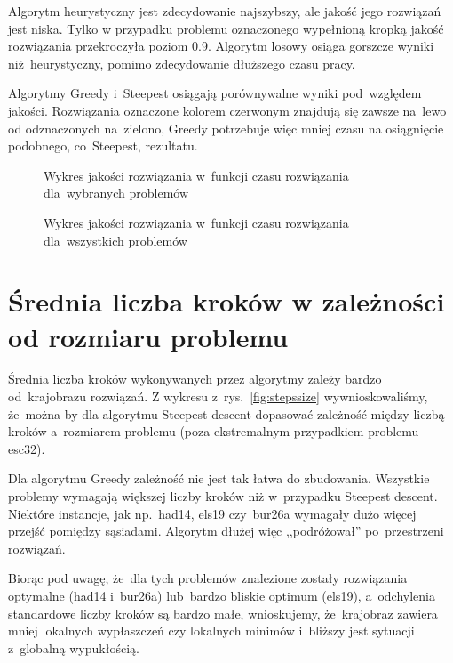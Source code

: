 \documentclass[a4paper,10pt]{article}
\begin{document}
Algorytm heurystyczny jest zdecydowanie najszybszy, ale jakość jego rozwiązań jest niska. 
Tylko w przypadku problemu oznaczonego wypełnioną kropką jakość rozwiązania przekroczyła poziom \num{0.9}.
Algorytm losowy osiąga gorszcze wyniki niż~heurystyczny, pomimo zdecydowanie dłuższego czasu pracy.

Algorytmy Greedy i~Steepest osiągają porównywalne wyniki pod~względem jakości.
Rozwiązania oznaczone kolorem czerwonym znajdują się zawsze na~lewo od odznaczonych na~zielono,
Greedy potrzebuje więc mniej czasu na osiągnięcie podobnego, co~Steepest, rezultatu.

\begin{figure}[!htpb]
\begin{center}

\caption{Wykres jakości rozwiązania w~funkcji czasu rozwiązania dla~wybranych problemów}
\label{fig:qualitytime}
\end{center}
\end{figure}

\begin{figure}
\begin{center}

\caption{Wykres jakości rozwiązania w~funkcji czasu rozwiązania dla~wszystkich problemów}
\label{fig:qualitytimefull}
\end{center}
\end{figure}

\section{Średnia liczba kroków w zależności od rozmiaru problemu}
Średnia liczba kroków wykonywanych przez algorytmy zależy bardzo od~krajobrazu rozwiązań.
Z wykresu z~rys.~\ref{fig:stepssize} wywnioskowaliśmy, że~można by dla algorytmu Steepest descent dopasować zależność między liczbą kroków
a~rozmiarem problemu (poza ekstremalnym przypadkiem problemu esc32).

Dla algorytmu Greedy zależność nie jest tak łatwa do zbudowania.
Wszystkie problemy wymagają większej liczby kroków niż w~przypadku Steepest descent. 
Niektóre instancje, jak np.~had14, els19 czy~bur26a wymagały dużo więcej przejść pomiędzy sąsiadami.
Algorytm dłużej więc ,,podróżował'' po~przestrzeni rozwiązań.

Biorąc pod uwagę, że~dla tych problemów znalezione zostały rozwiązania optymalne (had14 i~bur26a)
lub~bardzo bliskie optimum (els19), a~odchylenia standardowe liczby kroków są bardzo małe, wnioskujemy,
że~krajobraz zawiera mniej lokalnych wypłaszczeń czy lokalnych minimów i~bliższy jest sytuacji z~globalną wypukłością.
\end{document}
